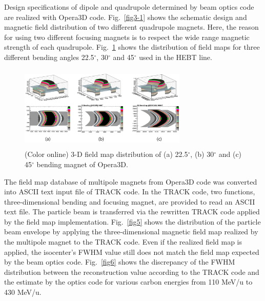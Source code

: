 \documentclass[jkps,preprint,fleqn,showpacs,showkeys,10pt,twocolumn]{revtex4}
\begin{document}
Design specifications of dipole and quadrupole determined by beam optics code are realized with Opera3D code.
Fig.~\ref{fig3-1} shows the schematic design and magnetic field distribution of two different quadrupole magnets. Here, the reason for using two different
focusing magnets is to respect the wide range magnetic strength of each quadrupole.
Fig.~\ref{fig4} shows the distribution of field maps for three different bending angles 22.5$^{\circ}$, 30$^{\circ}$ and 45$^{\circ}$ used in the HEBT line.
\begin{figure}
  \begin{center}
    \includegraphics[width=8.0cm, height=4cm]{Fig05.png}
    \caption{(Color online) 3-D field map distribution of (a) 22.5$^{\circ}$, (b) 30$^{\circ}$ and (c) 45$^{\circ}$ bending magnet of Opera3D.}
    \label{fig4}
  \end{center}
\end{figure}
The field map database of multipole magnets from Opera3D code was converted into ASCII text input file of TRACK code.
In the TRACK code, two functions, three-dimensional bending and focusing magnet, are provided to read an ASCII text file.
The particle beam is transferred via the rewritten TRACK code applied by the field map implementation.
Fig.~\ref{fig5} shows the distribution of the particle beam envelope by applying the three-dimensional magnetic field map realized by the multipole magnet to the TRACK code.
Even if the realized field map is applied, the isocenter's FWHM value still does not match the field map expected by the beam optics code.
Fig.~\ref{fig6} shows the discrepancy of the FWHM distribution between the reconstruction value according to the TRACK code
and the estimate by the optics code for various carbon energies from 110 MeV/u to 430 MeV/u.   
\end{document}
